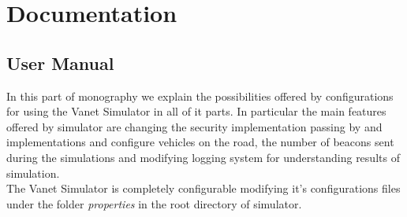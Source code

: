 \section{Documentation}
\subsection{User Manual}
In this part of monography we explain the possibilities offered by configurations for using the Vanet Simulator in all of it parts. In particular the main features offered by simulator are changing the security implementation passing by \baseline and \hybrid implementations and configure vehicles on the road, the number of beacons sent during the simulations and modifying logging system for understanding results of simulation.\\
The Vanet Simulator is completely configurable modifying it's configurations files under the folder \textit{properties} in the root directory of simulator.
